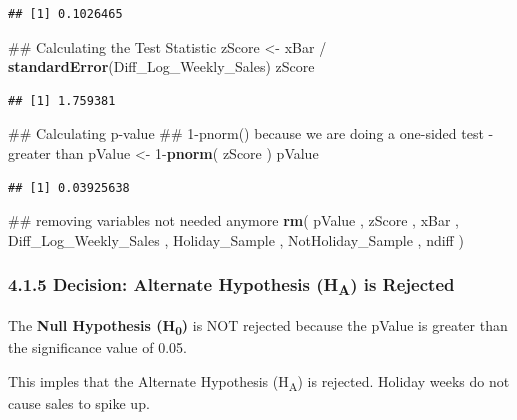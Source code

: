 \documentclass[]{article}
\newenvironment{Shaded}{\begin{snugshade}}{\end{snugshade}}
\newcommand{\KeywordTok}[1]{\textcolor[rgb]{0.13,0.29,0.53}{\textbf{{#1}}}}
\newcommand{\DecValTok}[1]{\textcolor[rgb]{0.00,0.00,0.81}{{#1}}}
\newcommand{\StringTok}[1]{\textcolor[rgb]{0.31,0.60,0.02}{{#1}}}
\newcommand{\NormalTok}[1]{{#1}}
\begin{document}
\begin{verbatim}
## [1] 0.1026465
\end{verbatim}

\begin{Shaded}
\begin{Highlighting}[]
\NormalTok{## Calculating the Test Statistic}
\NormalTok{zScore <-}\StringTok{ }\NormalTok{xBar /}\StringTok{ }\KeywordTok{standardError}\NormalTok{(Diff_Log_Weekly_Sales)}
\NormalTok{zScore}
\end{Highlighting}
\end{Shaded}

\begin{verbatim}
## [1] 1.759381
\end{verbatim}

\begin{Shaded}
\begin{Highlighting}[]
\NormalTok{## Calculating p-value}
\NormalTok{## 1-pnorm() because we are doing a one-sided test - greater than}
\NormalTok{pValue <-}\StringTok{ }\DecValTok{1}\NormalTok{-}\KeywordTok{pnorm}\NormalTok{( zScore ) }
\NormalTok{pValue}
\end{Highlighting}
\end{Shaded}

\begin{verbatim}
## [1] 0.03925638
\end{verbatim}

\begin{Shaded}
\begin{Highlighting}[]
\NormalTok{## removing variables not needed anymore}
\KeywordTok{rm}\NormalTok{( pValue , zScore , xBar , Diff_Log_Weekly_Sales , Holiday_Sample , }
    \NormalTok{NotHoliday_Sample , ndiff )}
\end{Highlighting}
\end{Shaded}

\subsubsection{4.1.5 Decision: Alternate Hypothesis (H\textsubscript{A})
is Rejected}\label{decision-alternate-hypothesis-ha-is-rejected}

The \textbf{Null Hypothesis (H\textsubscript{0})} is NOT rejected
because the pValue is greater than the significance value of 0.05.

This imples that the Alternate Hypothesis (H\textsubscript{A}) is
rejected. Holiday weeks do not cause sales to spike up.
\end{document}
